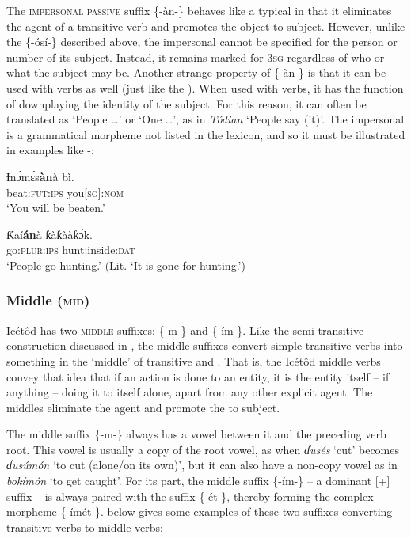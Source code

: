 The \textsc{impersonal passive} suffix \{-àn-\} behaves like a typical  in that it eliminates the agent of a transitive verb and promotes the object to subject. However, unlike the  \{-ósí-\} described above, the impersonal  cannot be specified for the person or number of its subject. Instead, it remains marked for 3\textsc{sg} regardless of who or what the subject may be. Another strange property of \{-\`{a}n-\} is that it can be used with  verbs as well (just like the ). When used with  verbs, it has the function of downplaying the identity of the subject. For this reason, it can often be translated as ‘People {\dots}’ or ‘One {\dots}’, as in \textit{Tódian} ‘People say (it)’. The impersonal  is a grammatical morpheme not listed in the lexicon, and so it must be illustrated in examples like -:




\ea\label{ex:verbs:3}
\gll Ɨn\'{ɔ}m\'{ɛ}s\textbf{àn}{à}   bì. \\
beat:\textsc{fut:ips}  you[\textsc{sg}]:\textsc{nom}    \\
\glt ‘You will be beaten.’ 
\z




\ea\label{ex:verbs:4}
\gll Ƙaí\textbf{án}{à}   ƙàƙààƙ\`{ɔ}k\ᵋ. \\
go:\textsc{plur:ips} hunt:inside:\textsc{dat}    \\
\glt ‘People go hunting.’ (Lit. ‘It is gone for hunting.’) 
\z




\subsubsection{Middle (\textsc{mid})}\label{sec:8.6.3}

Icétôd has two \textsc{middle} suffixes: \{-m-\} and \{-ím-\}. Like the semi-transitive construction discussed in , the middle suffixes convert simple transitive verbs into something in the ‘middle’ of transitive and . That is, the Icétôd middle verbs convey that idea that if an action is done to an entity, it is the entity itself – if anything – doing it to itself alone, apart from any other explicit agent. The middles eliminate the agent and promote the  to subject. 

The middle suffix \{-m-\} always has a vowel between it and the preceding verb root. This vowel is usually a copy of the root vowel, as when \textit{ɗusés} ‘cut’ becomes \textit{ɗusúmón} ‘to cut (alone/on its own)’, but it can also have a non-copy vowel as in \textit{bokímón} ‘to get caught’. For its part, the middle suffix \{-ím-\} – a dominant [+] suffix – is always paired with the  suffix \{-ét-\}, thereby forming the complex morpheme \{-ímét-\}.  below gives some examples of these two suffixes converting transitive verbs to middle verbs:


